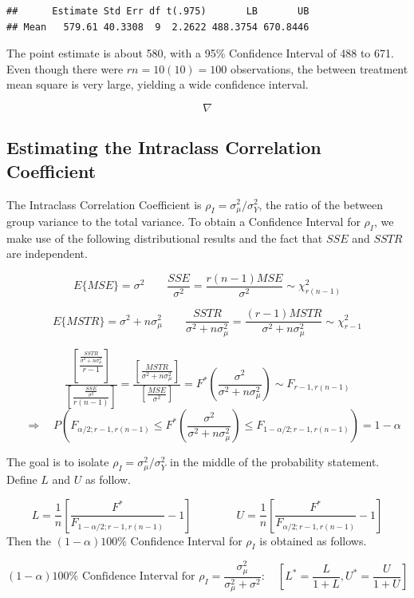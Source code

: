 \documentclass[
]{book}
\begin{document}
\begin{verbatim}
##      Estimate Std Err df t(.975)       LB       UB
## Mean   579.61 40.3308  9  2.2622 488.3754 670.8446
\end{verbatim}

The point estimate is about 580, with a 95\% Confidence Interval of 488
to 671. Even though there were \(rn=10(10)=100\) observations, the
between treatment mean square is very large, yielding a wide confidence
interval.

\[\nabla \]

\subsection{Estimating the Intraclass Correlation
Coefficient}\label{estimating-the-intraclass-correlation-coefficient}

The Intraclass Correlation Coefficient is
\(\rho_I=\sigma_{\mu}^2/\sigma_Y^2\), the ratio of the between group
variance to the total variance. To obtain a Confidence Interval for
\(\rho_I\), we make use of the following distributional results and the
fact that \(SSE\) and \(SSTR\) are independent.

\[
E\{MSE\}=\sigma^2 \qquad \frac{SSE}{\sigma^2}=\frac{r(n-1)MSE}{\sigma^2} \sim \chi_{r(n-1)}^2
\]

\[
E\{MSTR\}=\sigma^2 + n\sigma_{\mu}^2 \qquad
\frac{SSTR}{\sigma^2 + n\sigma_{\mu}^2}=
\frac{(r-1)MSTR}{\sigma^2 + n\sigma_{\mu}^2} \sim \chi_{r-1}^2
\]

\[
\frac{\left[\frac{\frac{SSTR}{\sigma^2 + n\sigma_{\mu}^2}}{r-1}\right]}  {
\left[\frac{\frac{SSE}{\sigma^2}}{r(n-1)}\right]} =
\frac{\left[\frac{MSTR}{\sigma^2 + n\sigma_{\mu}^2}\right]} {
\left[\frac{MSE}{\sigma^2}\right] } = F^*\left(\frac{\sigma^2}{\sigma^2 + n\sigma_{\mu}^2}
\right) \sim F_{r-1,r(n-1)}
\] \[
\quad \Rightarrow \quad
P\left(F_{\alpha/2;r-1,r(n-1)} \leq F^*\left(\frac{\sigma^2}{\sigma^2 + n\sigma_{\mu}^2}
\right) \leq F_{1-\alpha/2;r-1,r(n-1)}\right) = 1-\alpha
\]

The goal is to isolate \(\rho_I=\sigma_{\mu}^2/\sigma_Y^2\) in the
middle of the probability statement. Define \(L\) and \(U\) as follow.

\[
L= \frac{1}{n}\left[\frac{F^*}{F_{1-\alpha/2;r-1,r(n-1)}}-1\right]  \qquad \qquad
U= \frac{1}{n}\left[\frac{F^*}{F_{\alpha/2;r-1,r(n-1)}}-1\right]
\] Then the \((1-\alpha)100\%\) Confidence Interval for \(\rho_I\) is
obtained as follows.

\[
(1-\alpha)100\% \mbox{ Confidence Interval for }
\rho_I=\frac{\sigma_{\mu}^2}{\sigma_{\mu}^2+\sigma^2}: \quad
\left[L^*=\frac{L}{1+L},U^*=\frac{U}{1+U}\right]
\]
\end{document}
